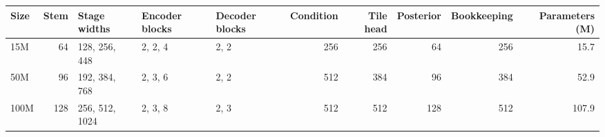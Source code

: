 \setlength{\tabcolsep}{3pt}
\begin{tabular*}{\textwidth}{@{\extracolsep{\fill}}lrlllrrrrr@{}}
\toprule
Size & Stem & Stage widths & Encoder blocks & Decoder blocks & Condition & Tile head & Posterior & Bookkeeping & Parameters (M) \\
\midrule
15M & 64 & 128, 256, 448 & 2, 2, 4 & 2, 2 & 256 & 256 & 64 & 256 & 15.7 \\
50M & 96 & 192, 384, 768 & 2, 3, 6 & 2, 2 & 512 & 384 & 96 & 384 & 52.9 \\
100M & 128 & 256, 512, 1024 & 2, 3, 8 & 2, 3 & 512 & 512 & 128 & 512 & 107.9 \\
\bottomrule
\end{tabular*}
